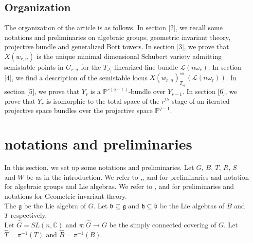 \documentclass[12pt,reqno]{amsart}
\numberwithin{equation}{section}
\theoremstyle{definition}
\begin{document}
\subsection{Organization}The organization of the article is as follows. In section [2], we recall some notations and preliminaries on algebraic groups, geometric invariant theory, projective bundle and generalized Bott towers. In section [3], we prove that $X(w_{r,n})$ is the unique minimal dimensional Schubert variety admitting semistable points in $G_{r,n}$ for the $T_{J_{r}}$-linearized line bundle $\mathcal{L}(n\omega_{r})$. In section [4], we find a description of the semistable locus $X(w_{r,n})^{ss}_{T_{J_{r}}}(\mathcal{L}(n\omega_{r}))$. In section [5], we prove that  $Y_{r}$ is a $\mathbb{P}^{r(q-1)}$-bundle over $Y_{r-1}$. In section [6], we prove that $Y_{r}$ is isomorphic to the total space of the $r^{th}$ stage of an iterated projective space bundles over the projective space $\mathbb{P}^{q-1}$.
\section{notations and preliminaries}
In this section, we set up some notations and preliminaries. Let $G$, $B$, $T$, $R$, $S$ and $W$ be as in the introduction. We refer to \cite{Hum1},\cite{Hum2}, and \cite{Jan} for preliminaries and notation for algebraic groups and Lie algebras. We refer to \cite{GIT}, and \cite{NEWSTEAD} for preliminaries and notations for Geometric invariant theory.\\
The $\mathfrak{g}$ be the Lie algebra of $G$. Let $\mathfrak{b}\subseteq\mathfrak{g}$ and $\mathfrak{h}\subseteq\mathfrak{b}$ be the Lie algebras of $B$ and $T$ respectively.\\
Let $\hat{G}=SL(n,\mathbb{C})$ and $\pi:\hat{G}\longrightarrow G$ be the simply connected covering of $G$. Let $\hat{T}=\pi^{-1}(T)$ and $\hat{B}=\pi^{-1}(B)$.
\end{document}
